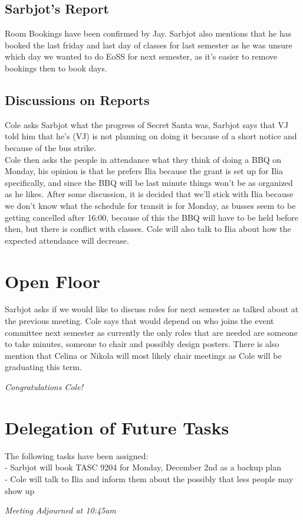 \documentclass[12pt]{article}
\begin{document}
\subsection{Sarbjot's Report}
Room Bookings have been confirmed by Jay. Sarbjot also mentions that he has booked the last friday and last day of classes for last semester as he was unsure which day we wanted to do EoSS for next semester, as it's easier to remove bookings then to book days. 


\subsection{Discussions on Reports}
\noindent Cole asks Sarbjot what the progress of Secret Santa was, Sarbjot says that VJ told him that he's (VJ) is not planning on doing it because of a short notice and because of the bus strike. \\

\noindent Cole then asks the people in attendance what they think of doing a BBQ on Monday, his opinion is that he prefers Ilia because the grant is set up for Ilia specifically, and since the BBQ will be last minute things won't be as organized as he likes. After some discussion, it is decided that we'll stick with Ilia because we don't know what the schedule for transit is for Monday, as busses seem to be getting cancelled after 16:00, because of this the BBQ will have to be held before then, but there is conflict with classes. Cole will also talk to Ilia about how the expected attendance will decrease.  \\ 

\section{Open Floor} \label{sec: Open}
\noindent Sarbjot asks if we would like to discuss roles for next semester as talked about at the previous meeting. Cole says that would depend on who joins the event committee next semester as currently the only roles that are needed are someone to take minutes, someone to chair and possibly design posters.  There is also mention that Celina or Nikola will most likely chair meetings as Cole will be graduating this term.  
\begin{center}
\em Congratulations Cole!  
\end{center}

\section{Delegation of Future Tasks} \label{sec: Future}
\noindent The following tasks have been assigned: \\
- Sarbjot will book TASC 9204 for Monday, December 2nd as a backup plan\\
- Cole will talk to Ilia and inform them about the possibly that less people may show up  \\
\begin{center}
\em{Meeting Adjourned at 10:45am}
\end{center}
\end{document}
